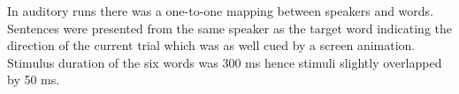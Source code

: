 \documentclass[10pt,letterpaper]{article}
\begin{document}
In auditory runs there was a one-to-one mapping between speakers and words.
Sentences were presented from the same speaker as the target word indicating the direction of the current trial which was as well cued by a screen animation.
Stimulus duration of the six words was 300 ms hence stimuli slightly overlapped by 50 ms.




\setlength{\bibleftmargin}{.125in}
\setlength{\bibindent}{-\bibleftmargin}


\end{document}
